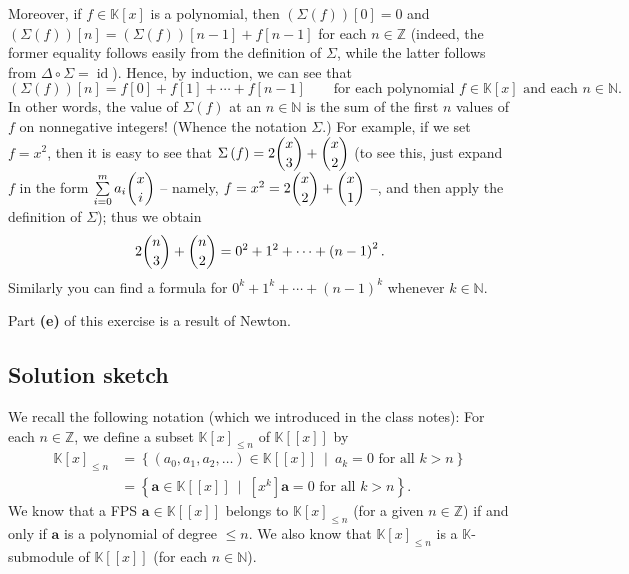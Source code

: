 \documentclass[paper=a4, fontsize=12pt]{scrartcl}%
\let\sumnonlimits\sum
\renewcommand{\sum}{\sumnonlimits\limits}
\theoremstyle{plainsl}
\theoremstyle{definition}
\theoremstyle{remark}
\begin{document}
Moreover, if $f \in\mathbb{K}\left[  x \right]  $ is a polynomial, then
$\left(  \Sigma\left(  f \right)  \right)  \left[  0 \right]  = 0$ and
$\left(  \Sigma\left(  f \right)  \right)  \left[  n \right]  = \left(
\Sigma\left(  f \right)  \right)  \left[  n-1 \right]  + f \left[  n-1
\right]  $ for each $n \in\mathbb{Z}$ (indeed, the former equality follows
easily from the definition of $\Sigma$, while the latter follows from
$\Delta\circ\Sigma= \operatorname{id}$). Hence, by induction, we can see that
\[
\left(  \Sigma\left(  f \right)  \right)  \left[  n \right]  = f\left[  0
\right]  + f\left[  1 \right]  + \cdots+ f\left[  n-1 \right]  \qquad\text{for
each polynomial $f \in\mathbb{K}\left[  x \right]  $ and each $n \in
\mathbb{N}$}.
\]
In other words, the value of $\Sigma\left(  f \right)  $ at an $n
\in\mathbb{N} $ is the sum of the first $n$ values of $f$ on nonnegative
integers! (Whence the notation $\Sigma$.) For example, if we set $f = x^{2}$,
then it is easy to see that $\Sigma\left(  f \right)  = 2 \dbinom{x}{3} +
\dbinom{x}{2}$ (to see this, just expand $f$ in the form $\sum_{i=0}^{m} a_{i}
\dbinom{x}{i}$ -- namely, $f = x^{2} = 2 \dbinom{x}{2} + \dbinom{x}{1}$ --,
and then apply the definition of $\Sigma$); thus we obtain
\[
2 \dbinom{n}{3} + \dbinom{n}{2} = 0^{2} + 1^{2} + \cdots+ \left(  n-1 \right)
^{2} .
\]
Similarly you can find a formula for $0^{k} + 1^{k} + \cdots+ \left(  n-1
\right)  ^{k}$ whenever $k \in\mathbb{N}$.

Part \textbf{(e)} of this exercise is a result of Newton.

\subsection{Solution sketch}

We recall the following notation (which we introduced in the class notes): For
each $n\in\mathbb{Z}$, we define a subset $\mathbb{K}\left[  x\right]  _{\leq
n}$ of $\mathbb{K}\left[  \left[  x\right]  \right]  $ by%
\begin{align*}
\mathbb{K}\left[  x\right]  _{\leq n}  &  =\left\{  \left(  a_{0},a_{1}%
,a_{2},\ldots\right)  \in\mathbb{K}\left[  \left[  x\right]  \right]
\ \mid\ a_{k}=0\text{ for all }k>n\right\} \\
&  =\left\{  \mathbf{a}\in\mathbb{K}\left[  \left[  x\right]  \right]
\ \mid\ \left[  x^{k}\right]  \mathbf{a}=0\text{ for all }k>n\right\}  .
\end{align*}
We know that a FPS $\mathbf{a}\in\mathbb{K}\left[  \left[  x\right]  \right]
$ belongs to $\mathbb{K}\left[  x\right]  _{\leq n}$ (for a given
$n\in\mathbb{Z}$) if and only if $\mathbf{a}$ is a polynomial of degree $\leq
n$. We also know that $\mathbb{K}\left[  x\right]  _{\leq n}$ is a
$\mathbb{K}$-submodule of $\mathbb{K}\left[  \left[  x\right]  \right]  $ (for
each $n\in\mathbb{N}$).
\end{document}
